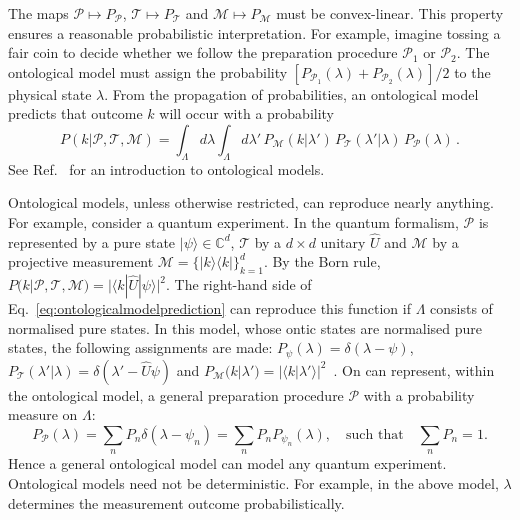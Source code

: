 \documentclass[%
 reprint,
superscriptaddress,
nofootinbib,
bibnotes,
 amsmath,amssymb,
 aps,
]{revtex4-1}
\theoremstyle{plain}
\newcommand*{\ketbra}[2]{\lvert #1 \rangle\!\langle #2 \rvert}
\begin{document}
The maps ${\mathscr{P}} \mapsto P_{\mathscr{P}}$, ${\mathscr{T}} \mapsto P_{\mathscr{T}}$ and ${\mathscr{M}} \mapsto P_{\mathscr{M}}$ must be convex-linear. This property ensures a reasonable probabilistic interpretation. For example, imagine tossing a fair coin to decide whether we follow the preparation procedure ${\mathscr{P}}_1$ or ${\mathscr{P}}_2$. The ontological model must assign the probability 
$[P_{{\mathscr{P}}_1}(\lambda) + P_{{\mathscr{P}}_2}(\lambda) ]/2$ to the physical state $\lambda$. 
From the propagation of probabilities, an ontological model predicts that outcome $k$ will occur with a probability
 \begin{equation}
 \label{eq:ontologicalmodelprediction}
     P(k|{\mathscr{P}},{\mathscr{T}},{\mathscr{M}}) = \int_{\Lambda} d\lambda \int_{\Lambda} d\lambda'  \, P_{\mathscr{M}}(k|\lambda') \, P_{\mathscr{T}}(\lambda'|\lambda) \, P_{\mathscr{P}}(\lambda)\, .
 \end{equation} 
See Ref.~\cite{leifer2014quantum} for an introduction to ontological models.
 
Ontological models, unless otherwise restricted, can reproduce nearly anything. 
For example, consider a quantum experiment. In the quantum formalism, ${\mathscr{P}}$ is represented by a pure state $|\psi\rangle \in \mathbb{C}^d$, ${\mathscr{T}}$ by a  $d \times d$ unitary $\hat{U}$ and ${\mathscr{M}}$ by a projective measurement $\mathcal{M} = \{ \ketbra{k}{k} \}_{k=1}^d$. 
By the Born rule,
$P(k|{\mathscr{P}},{\mathscr{T}},{\mathscr{M}}) = |\langle k| \hat{U} |\psi\rangle|^2$.
The right-hand side of Eq.~\eqref{eq:ontologicalmodelprediction} can reproduce this function if $\Lambda$ consists of normalised pure states.  
In this model, whose ontic states are normalised pure states, the following assignments are made: $P_\psi(\lambda)  = \delta(\lambda- \psi)$, 
$P_{\mathscr{T}}(\lambda'|\lambda) = \delta(\lambda' - \hat{U} \psi)$ and 
$P_{\mathscr{M}}(k|\lambda') = |\langle k| \lambda'\rangle|^2$~\cite{beltrametti1995classical}.
On can represent, within the ontological model, a general preparation procedure ${\mathscr{P}}$ with a probability  measure on $\Lambda$:
 \begin{equation}\label{eq:pPdef}
 P_{\mathscr{P}}(\lambda)=\sum_n P_n\delta(\lambda-\psi_n)=\sum_n P_n P_{\psi_n}(\lambda),
 \quad \text{such that} \quad 
 \sum_n P_n=1.
 \end{equation}
Hence 
a general ontological model
can model any quantum experiment.
Ontological models 
need not be deterministic. For example, in the above model, $\lambda$ determines the measurement outcome probabilistically.
 
\end{document}
